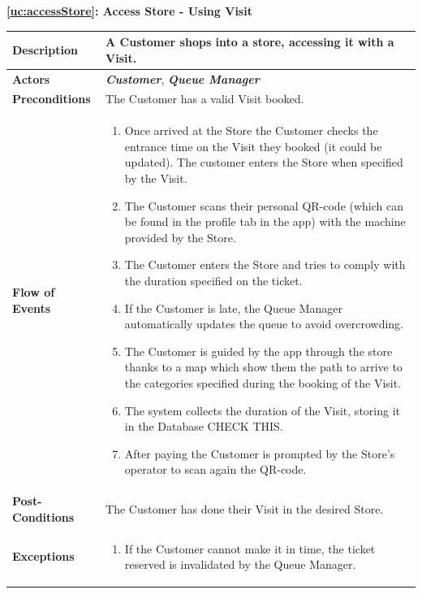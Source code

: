 \documentclass[a4paper, 10pt, oneside]{article}
\newcommand*{\lorenzo}[1]{\textcolor{BurntOrange}{#1}}
\begin{document}
\begin{center}
{\textbf{\ref{uc:accessStore}: Access Store - Using Visit}}
\end{center}
\begin{tabularx}{\linewidth}{| l | X |}
	
	\hline
	\textbf{Description} & A Customer shops into a store, accessing it with a Visit.\\
	

	\hline
	\textbf{Actors} & \textbf{\textit{Customer}}, \textit{\textbf{Queue Manager}}  \\
	
	\hline
	\textbf{Preconditions} & The Customer has a valid Visit booked.\\
	
	\hline
	\textbf{Flow of Events} & \parbox{0.7\textwidth}{	
		\begin{enumerate}
			\item Once arrived at the Store the Customer checks the entrance time on the Visit they booked (it could be updated). The customer enters the Store when specified by the Visit.
			\item The Customer scans their personal QR-code (which can be found in the profile tab in the app) with the machine provided by the Store.
			\item The Customer enters the Store and tries to comply with the duration specified on the ticket.
			\item If the Customer is late, the Queue Manager automatically updates the queue to avoid overcrowding.
			\item The Customer is guided by the app through the store thanks to a map which show them the path to arrive to the categories specified during the booking of the Visit.
			\item The system collects the duration of the Visit, storing it in the Database \lorenzo{CHECK THIS}.
			\item After paying the Customer is prompted by the Store's operator to scan again the QR-code.
	\end{enumerate}}\\
	
	\hline
	\textbf{Post-Conditions} & The Customer has done their Visit in the desired Store.\\
	
	\hline
	\textbf{Exceptions} & \parbox{0.7\textwidth}{ \begin{enumerate}
			\item If the Customer cannot make it in time, the ticket reserved is invalidated by the Queue Manager.
		\end{enumerate}}\\

	\hline
\end{tabularx}
\end{document}
